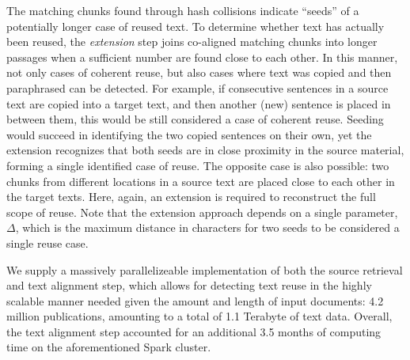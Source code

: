 The matching chunks found through hash collisions indicate ``seeds'' of a potentially longer case of reused text. To determine whether text has actually been reused, the \emph{extension} step joins co-aligned matching chunks into longer passages when a sufficient number are found close to each other. In this manner, not only cases of coherent reuse, but also cases where text was copied and then paraphrased can be detected. For example, if consecutive sentences in a source text are copied into a target text, and then another (new) sentence is placed in between them, this would be still considered a case of coherent reuse. Seeding would succeed in identifying the two copied sentences on their own, yet the extension recognizes that both seeds are in close proximity in the source material, forming a single identified case of reuse. The opposite case is also possible: two chunks from different locations in a source text are placed close to each other in the target texts. Here, again, an extension is required to reconstruct the full scope of reuse. Note that the extension approach depends on a single parameter,~$\Delta$, which is the maximum distance in characters for two seeds to be considered a single reuse case. \cite{stamatatos:2011}

We supply a massively parallelizeable implementation of both the source retrieval and text alignment step, which allows for detecting text reuse in the highly scalable manner needed given the amount and length of input documents: 4.2 million publications, amounting to a total of 1.1 Terabyte of text data. Overall, the text alignment step accounted for an additional 3.5 months of computing time on the aforementioned Spark cluster.

